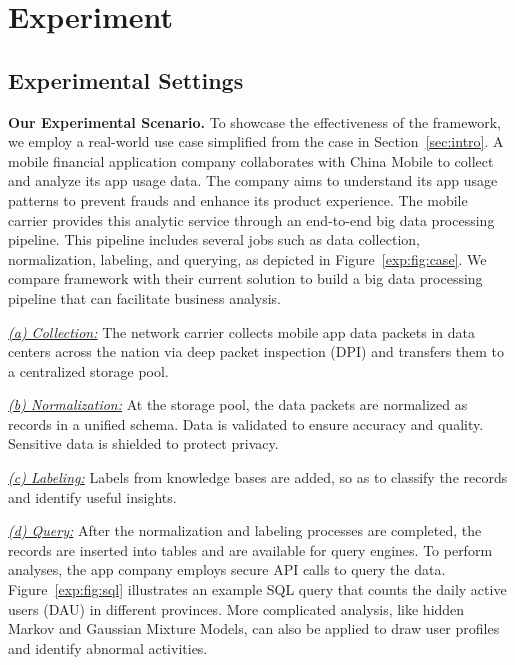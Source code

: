 \section{Experiment} 
\label{sec:exp}

\subsection{Experimental Settings}


\noindent \textbf{Our Experimental Scenario.} To showcase the effectiveness of the \sys framework, we employ a real-world use case simplified from the case in Section~\ref{sec:intro}.   A mobile financial application company collaborates with China Mobile to collect and analyze its app usage data. The company aims to understand its app usage patterns to prevent frauds and enhance its product experience. The mobile carrier provides this analytic service through an end-to-end big data processing pipeline. This pipeline includes several jobs such as data collection, normalization, labeling, and querying, as depicted in Figure~\ref{exp:fig:case}.
We compare  \sys framework with their current solution to build a big data processing pipeline that can facilitate business analysis.

\noindent \underline{\textit{(a) Collection:}}  The network carrier collects mobile app data packets in  data centers across the nation via deep packet inspection (DPI) and transfers them to a centralized storage pool.

\noindent \underline{\textit{(b) Normalization:}} At the  storage pool, the data packets are normalized as records in a unified schema. Data is validated to ensure accuracy and quality. Sensitive data is shielded to protect  privacy. 

\noindent \underline{\textit{(c) Labeling:}} Labels from knowledge bases are added, so as to classify the records and identify useful insights.

\noindent \underline{\textit{(d) Query:}} After the normalization and labeling processes are completed, the  records are inserted into tables and are available for query engines. To perform analyses, the app company employs secure API calls to query the data. Figure~\ref{exp:fig:sql} illustrates an example SQL query that counts the daily active users (DAU) in different provinces. More complicated analysis, like hidden Markov and Gaussian Mixture Models, can also be applied to draw user profiles and identify abnormal activities.

